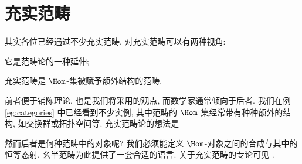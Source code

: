 \section{充实范畴}\label{sec:enriched-cat}
其实各位已经遇过不少充实范畴. 对充实范畴可以有两种视角:
\begin{compactitem}
	\item 它是范畴论的一种延伸;
	\item 充实范畴是 $\Hom$-集被赋予额外结构的范畴.
\end{compactitem}
前者便于铺陈理论, 也是我们将采用的观点, 而数学家通常倾向于后者. 我们在例 \ref{eg:categories} 中已经看到不少实例, 其中范畴的 $\Hom$ 集经常带有种种额外的结构, 如交换群或拓扑空间等. 充实范畴论的想法是
\begin{center}\end{center}
然而后者是何种范畴中的对象呢? 我们必须能定义 $\Hom$-对象之间的合成与其中的恒等态射, 幺半范畴为此提供了一套合适的语言. 关于充实范畴的专论可见 \cite{Ke05}.

